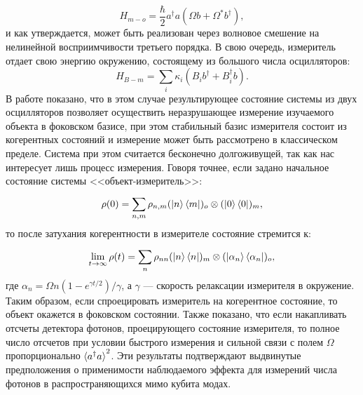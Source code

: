 \begin{equation}
	H_{m-o} = \frac{\hbar}{2}a^\dag a(\Omega b + \Omega^* b^\dag),
\end{equation}
и как утверждается, может быть реализован через волновое смешение на нелинейной восприимчивости третьего порядка. В свою очередь, измеритель отдает свою энергию окружению, состоящему из большого числа осцилляторов:
\begin{equation}
	H_{B-m} = \sum_i^{}\kappa_i\left(B_ib^\dag +B^\dag_i b\right).
\end{equation}
В работе \cite{WallsMilburn_PRD} показано, что в этом случае результирующее состояние системы из двух осцилляторов позволяет осуществить неразрушающее измерение изучаемого объекта в фоковском базисе, при этом стабильный базис измерителя состоит из когерентных состояний и измерение может быть рассмотрено в классическом пределе. Система при этом считается бесконечно долгоживущей, так как нас интересует лишь процесс измерения. Говоря точнее, если задано начальное состояние системы <<объект-измеритель>>:
\begin{equation}
	\rho(0) = \sum_{n,m}^{}\rho_{n,m}(\ket{n}\bra{m})_o\otimes(\ket{0}\bra{0})_m,
\end{equation}
то после затухания когерентности в измерителе состояние стремится к:
\begin{equation}
	\lim_{t \to \infty}\rho(t) = \sum_n^{}\rho_{nn} (\ket{n}\bra{n})_m \otimes
	(\ket{\alpha_n}\bra{\alpha_n})_o,
\end{equation}
где $\alpha_n = \Omega n (1-e^{\gamma t/2})/\gamma$, а $\gamma$ --- скорость релаксации измерителя в окружение. Таким образом, если спроецировать измеритель на когерентное состояние, то объект окажется в фоковском состоянии. Также показано, что если накапливать отсчеты детектора фотонов, проецирующего состояние измерителя, то полное число отсчетов при условии быстрого измерения и сильной связи с полем $\Omega$ пропорционально $\braket{a^\dag a}^2$. Эти результаты подтверждают выдвинутые предположения о применимости наблюдаемого эффекта для измерений числа фотонов в распространяющихся мимо кубита модах. 

